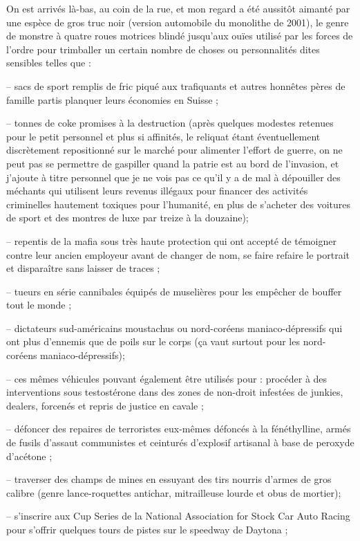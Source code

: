 On est arrivés là-bas, au coin de la rue, et mon regard a été aussitôt aimanté par une espèce de gros truc noir (version automobile du monolithe de 2001), le genre de monstre à quatre roues motrices blindé jusqu’aux ouïes utilisé par les forces de l’ordre pour trimballer un certain nombre de choses ou personnalités dites sensibles telles que :

– sacs de sport remplis de fric piqué aux trafiquants et autres honnêtes pères de famille partis planquer leurs économies en Suisse ;

– tonnes de coke promises à la destruction (après quelques modestes retenues pour le petit personnel et plus si affinités, le reliquat étant éventuellement discrètement repositionné sur le marché pour alimenter l’effort de guerre, on ne peut pas se permettre de gaspiller quand la patrie est au bord de l’invasion, et j’ajoute à titre personnel que je ne vois pas ce qu’il y a de mal à dépouiller des méchants qui utilisent leurs revenus illégaux pour financer des activités criminelles hautement toxiques pour l’humanité, en plus de s’acheter des voitures de sport et des montres de luxe par treize à la douzaine);

– repentis de la mafia sous très haute protection qui ont accepté de témoigner contre leur ancien employeur avant de changer de nom, se faire refaire le portrait et disparaître sans laisser de traces ;

– tueurs en série cannibales équipés de muselières pour les empêcher de bouffer tout le monde ;

– dictateurs sud-américains moustachus ou nord-coréens maniaco-dépressifs qui ont plus d’ennemis que de poils sur le corps (ça vaut surtout pour les nord-coréens maniaco-dépressifs);

– ces mêmes véhicules pouvant également être utilisés pour : procéder à des interventions sous testostérone dans des zones de non-droit infestées de junkies, dealers, forcenés et repris de justice en cavale ;

– défoncer des repaires de terroristes eux-mêmes défoncés à la fénéthylline, armés de fusils d’assaut communistes et ceinturés d’explosif artisanal à base de peroxyde d’acétone ;

– traverser des champs de mines en essuyant des tirs nourris d’armes de gros calibre (genre lance-roquettes antichar, mitrailleuse lourde et obus de mortier);

– s’inscrire aux Cup Series de la National Association for Stock Car Auto Racing pour s’offrir quelques tours de pistes sur le speedway de Daytona ;

